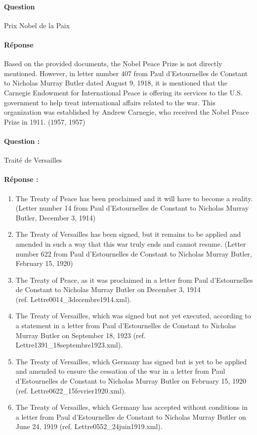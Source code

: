 \separation

\paragraph{Question}
Prix Nobel de la Paix

\paragraph{Réponse}
Based on the provided documents, the Nobel Peace Prize is not directly mentioned. However, in letter number 407 from Paul d'Estournelles de Constant to Nicholas Murray Butler dated August 9, 1918, it is mentioned that the Carnegie Endowment for International Peace is offering its services to the U.S. government to help treat international affairs related to the war. This organization was established by Andrew Carnegie, who received the Nobel Peace Prize in 1911. (1957, 1957)

\separation

\paragraph{Question : } Traité de Versailles

\paragraph{Réponse : }
\begin{enumerate}
    \item The Treaty of Peace has been proclaimed and it will have to become a reality. (Letter number 14 from Paul d'Estournelles de Constant to Nicholas Murray Butler, December 3, 1914)
    \item The Treaty of Versailles has been signed, but it remains to be applied and amended in such a way that this war truly ends and cannot resume. (Letter number 622 from Paul d'Estournelles de Constant to Nicholas Murray Butler, February 15, 1920)
    \item The Treaty of Peace, as it was proclaimed in a letter from Paul d'Estournelles de Constant to Nicholas Murray Butler on December 3, 1914 \\ (ref. Lettre0014\_3decembre1914.xml).
    \item The Treaty of Versailles, which was signed but not yet executed, according to a statement in a letter from Paul d'Estournelles de Constant to Nicholas Murray Butler on September 18, 1923 (ref. Lettre1391\_18septembre1923.xml).
    \item The Treaty of Versailles, which Germany has signed but is yet to be applied and amended to ensure the cessation of the war in a letter from Paul d'Estournelles de Constant to Nicholas Murray Butler on February 15, 1920 (ref. Lettre0622\_15fevrier1920.xml).
    \item The Treaty of Versailles, which Germany has accepted without conditions in a letter from Paul d'Estournelles de Constant to Nicholas Murray Butler on June 24, 1919 (ref. Lettre0552\_24juin1919.xml).
\end{enumerate}

